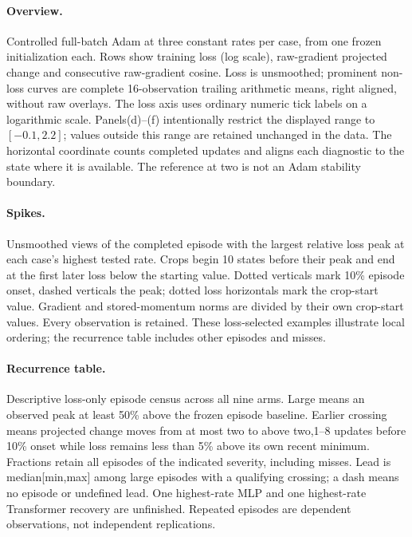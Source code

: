 \paragraph{Overview.}
Controlled full-batch Adam at three constant rates per case, from one frozen
initialization each. Rows show training loss (log scale), raw-gradient projected
change and consecutive raw-gradient cosine. Loss is unsmoothed; prominent
non-loss curves are complete 16-observation trailing arithmetic means,
right aligned, without raw overlays. The loss axis uses ordinary numeric
tick labels on a logarithmic scale.
Panels(d)--(f) intentionally restrict the displayed range to$[-0.1,2.2]$;
values outside this range are retained unchanged in the data. The horizontal
coordinate counts completed updates and aligns each diagnostic to the state
where it is available. The reference at two is not an Adam stability boundary.

\paragraph{Spikes.}
Unsmoothed views of the completed episode with the largest relative loss peak
at each case's highest tested rate. Crops begin 10 states before their peak and
end at the first later loss below the starting value. Dotted verticals mark
10\% episode onset, dashed verticals the peak; dotted loss horizontals mark
the crop-start value. Gradient and stored-momentum norms are divided by their
own crop-start values. Every observation is retained. These loss-selected
examples illustrate local ordering; the recurrence table includes other
episodes and misses.

\paragraph{Recurrence table.}
Descriptive loss-only episode census across all nine arms. Large means an
observed peak at least 50\% above the frozen episode baseline. Earlier crossing
means projected change moves from at most two to above two,1--8 updates before
10\% onset while loss remains less than 5\% above its own recent minimum.
Fractions retain all episodes of the indicated severity, including misses.
Lead is median[min,max] among large episodes with a qualifying crossing;
a dash means no episode or undefined lead. One highest-rate MLP and one
highest-rate Transformer recovery are unfinished. Repeated episodes are
dependent observations, not independent replications.
